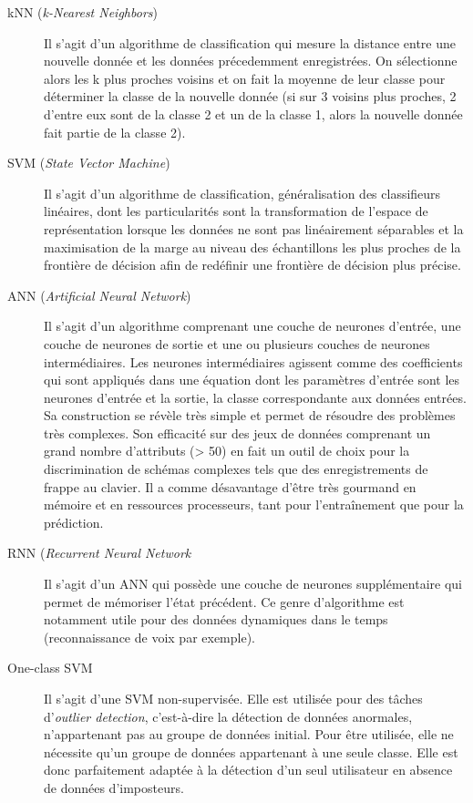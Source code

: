 \begin{description}
  \item[kNN\cite{Hu2008} (\textit{k-Nearest Neighbors})] Il s'agit d'un algorithme de classification qui mesure la distance entre une nouvelle donnée et les données précedemment enregistrées. On sélectionne alors les k plus proches voisins et on fait la moyenne de leur classe pour déterminer la classe de la nouvelle donnée (si sur 3 voisins plus proches, 2 d'entre eux sont de la classe 2 et un de la classe 1, alors la nouvelle donnée fait partie de la classe 2).
  \item[SVM\cite{giotSVM} (\textit{State Vector Machine})] Il s'agit d'un algorithme de classification, généralisation des classifieurs linéaires, dont les particularités sont la transformation de l'espace de représentation lorsque les données ne sont pas linéairement séparables et la maximisation de la marge au niveau des échantillons les plus proches de la frontière de décision afin de redéfinir une frontière de décision plus précise.
  \item[ANN\cite{giotBenchmark} (\textit{Artificial Neural Network})] Il s'agit d'un algorithme comprenant une couche de neurones d'entrée, une couche de neurones de sortie et une ou plusieurs couches de neurones intermédiaires. Les neurones intermédiaires agissent comme des coefficients qui sont appliqués dans une équation dont les paramètres d'entrée sont les neurones d'entrée et la sortie, la classe correspondante aux données entrées. Sa construction se révèle très simple et permet de résoudre des problèmes très complexes. Son efficacité sur des jeux de données comprenant un grand nombre d'attributs (> 50) en fait un outil de choix pour la discrimination de schémas complexes tels que des enregistrements de frappe au clavier. Il a comme désavantage d'être très gourmand en mémoire et en ressources processeurs, tant pour l'entraînement que pour la prédiction.
  \item[RNN\cite{kobojekRNN} (\textit{Recurrent Neural Network}] Il s'agit d'un ANN qui possède une couche de neurones supplémentaire qui permet de mémoriser l'état précédent. Ce genre d'algorithme est notamment utile pour des données dynamiques dans le temps (reconnaissance de voix par exemple).
  \item[One-class SVM\cite{oneclassSVM}] Il s'agit d'une SVM non-supervisée. Elle est utilisée pour des tâches d'\textit{outlier detection}, c'est-à-dire la détection de données anormales, n'appartenant pas au groupe de données initial. Pour être utilisée, elle ne nécessite qu'un groupe de données appartenant à une seule classe. Elle est donc parfaitement adaptée à la détection d'un seul utilisateur en absence de données d'imposteurs.
\end{description}


